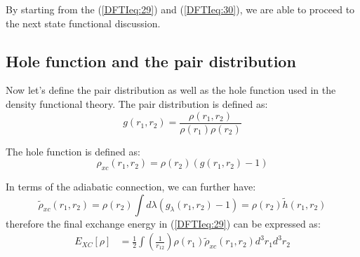 By starting from the (\ref{DFTIeq:29}) and (\ref{DFTIeq:30}), we are
able to proceed to the next state functional discussion.

\subsection{Hole function and the pair distribution}
\label{hole_function_pair_distribution}
%
%
%
%
Now let's define the pair distribution as well as the hole function used in 
the density functional theory. The pair distribution is defined as:
\begin{equation}
 \label{hole_func_pair_distribution_eq:1}
g(r_{1},r_{2}) = 
\frac{\rho(r_{1},r_{2})}{\rho(r_{1})\rho(r_{2})}
\end{equation}

The hole function is defined as:
\begin{equation}
  \label{hole_func_pair_distribution_eq:2}
\rho_{xc}(r_{1},r_{2}) = 
\rho(r_{2})(g(r_{1},r_{2}) - 1) 
\end{equation}

In terms of the adiabatic connection, we can further have:
\begin{equation}
  \label{hole_func_pair_distribution_eq:3}
\widetilde{\rho}_{xc}(r_{1},r_{2}) = 
\rho(r_{2})\int d\lambda (g_{\lambda}(r_{1},r_{2}) - 1) 
= \rho(r_{2})\widetilde{h}(r_{1}, r_{2})
\end{equation}
therefore the final exchange energy in (\ref{DFTIeq:29}) can be expressed as:
\begin{align}
\label{hole_func_pair_distribution_eq:4}                                        
E_{XC}[\rho] &= \frac{1}{2} \int \left(\frac{1}{r_{12}}\right)
\rho(r_{1})\widetilde{\rho}_{xc}(r_{1},r_{2})d^{3}r_{1}d^{3}r_{2}   
\end{align}

